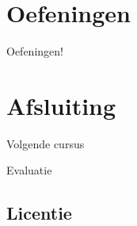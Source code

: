 \documentclass[
    dutch,
    everyoneauthor=true,
    darktheme,
    defaultSlideCollection=vincent,
    handout
]{../../cursuspresentatie}
\let\placetarget\relax
\let\placetarget\relax
\begin{document}

\section{Oefeningen}

\def\placetarget{\hypertarget{oefeningen2}{}}

\begin{frame}
    \begin{center}
        {\LARGE Oefeningen!}
        \vspace{30pt}

        

    \end{center}
\end{frame}





\section{Afsluiting}

\begin{frame}
    Volgende cursus
\end{frame}

\begin{frame}
    Evaluatie
\end{frame}

\subsection{Licentie}
    
\end{document}
